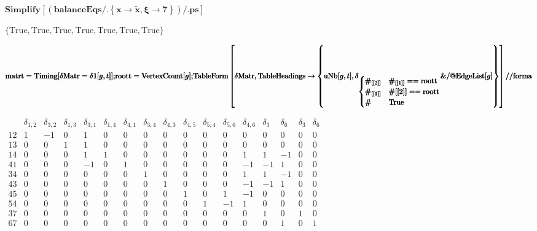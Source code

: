 \documentclass{article}
\newcommand{\unicode}[1]{{}}
\begin{document}
\begin{doublespace}
\noindent\(\pmb{\text{Simplify}\left[\left(\text{balanceEqs}\text{/.}\left\{x\to \tilde{x},\xi \to 7\right\}\right)\text{/.}\text{ps}\right]}\)
\end{doublespace}

\begin{doublespace}
\noindent\(\{\text{True},\text{True},\text{True},\text{True},\text{True},\text{True},\text{True}\}\)
\end{doublespace}

\begin{doublespace}
\noindent\(\pmb{\text{matrt}=\text{Timing}[\text{$\delta $Matr}=\text{$\delta $1}[g,t]];}\\
\pmb{\text{roott}=\text{VertexCount}[g];}\\
\pmb{\text{TableForm}\left[\text{$\delta $Matr},\text{TableHeadings}\to \left\{\text{uNb}[g,t],\delta _{\begin{cases}
 \#_{[[2]]} & \#_{[[1]]}== \text{roott} \\
 \#_{[[1]]} & \#[[2]]==\text{roott} \\
 \# & \text{True}
\end{cases}
}\&\text{/@}\text{EdgeList}[g]\right\}\right]\text{//}\text{forma}}\)
\end{doublespace}

\begin{doublespace}
\noindent\(\begin{array}{l|llllllllllllllll}
  & \delta _{1,2} & \delta _{3,2} & \delta _{1,3} & \delta _{3,1} & \delta _{1,4} & \delta _{4,1} & \delta _{3,4} & \delta _{4,3} & \delta _{4,5}
& \delta _{5,4} & \delta _{5,6} & \delta _{4,6} & \delta _3 & \delta _6 & \delta _3 & \delta _6 \\
\hline
 1\unicode{f3d5}2 & 1 & -1 & 0 & 1 & 0 & 0 & 0 & 0 & 0 & 0 & 0 & 0 & 0 & 0 & 0 & 0 \\
 1\unicode{f3d5}3 & 0 & 0 & 1 & 1 & 0 & 0 & 0 & 0 & 0 & 0 & 0 & 0 & 0 & 0 & 0 & 0 \\
 1\unicode{f3d5}4 & 0 & 0 & 0 & 1 & 1 & 0 & 0 & 0 & 0 & 0 & 0 & 1 & 1 & -1 & 0 & 0 \\
 4\unicode{f3d5}1 & 0 & 0 & 0 & -1 & 0 & 1 & 0 & 0 & 0 & 0 & 0 & -1 & -1 & 1 & 0 & 0 \\
 3\unicode{f3d5}4 & 0 & 0 & 0 & 0 & 0 & 0 & 1 & 0 & 0 & 0 & 0 & 1 & 1 & -1 & 0 & 0 \\
 4\unicode{f3d5}3 & 0 & 0 & 0 & 0 & 0 & 0 & 0 & 1 & 0 & 0 & 0 & -1 & -1 & 1 & 0 & 0 \\
 4\unicode{f3d5}5 & 0 & 0 & 0 & 0 & 0 & 0 & 0 & 0 & 1 & 0 & 1 & -1 & 0 & 0 & 0 & 0 \\
 5\unicode{f3d5}4 & 0 & 0 & 0 & 0 & 0 & 0 & 0 & 0 & 0 & 1 & -1 & 1 & 0 & 0 & 0 & 0 \\
 3\unicode{f3d5}7 & 0 & 0 & 0 & 0 & 0 & 0 & 0 & 0 & 0 & 0 & 0 & 0 & 1 & 0 & 1 & 0 \\
 6\unicode{f3d5}7 & 0 & 0 & 0 & 0 & 0 & 0 & 0 & 0 & 0 & 0 & 0 & 0 & 0 & 1 & 0 & 1 \\
\end{array}\)
\end{doublespace}
\end{document}
